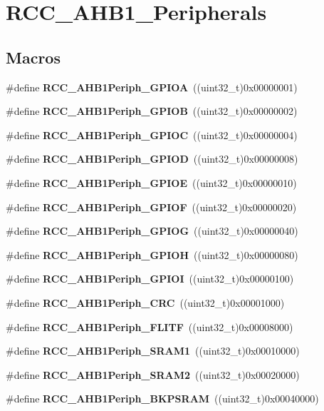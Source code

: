 \section{R\+C\+C\+\_\+\+A\+H\+B1\+\_\+\+Peripherals}
\label{group__RCC__AHB1__Peripherals}
\subsection*{Macros}
\begin{DoxyCompactItemize}
\item 
\#define \textbf{ R\+C\+C\+\_\+\+A\+H\+B1\+Periph\+\_\+\+G\+P\+I\+OA}~((uint32\+\_\+t)0x00000001)
\item 
\#define \textbf{ R\+C\+C\+\_\+\+A\+H\+B1\+Periph\+\_\+\+G\+P\+I\+OB}~((uint32\+\_\+t)0x00000002)
\item 
\#define \textbf{ R\+C\+C\+\_\+\+A\+H\+B1\+Periph\+\_\+\+G\+P\+I\+OC}~((uint32\+\_\+t)0x00000004)
\item 
\#define \textbf{ R\+C\+C\+\_\+\+A\+H\+B1\+Periph\+\_\+\+G\+P\+I\+OD}~((uint32\+\_\+t)0x00000008)
\item 
\#define \textbf{ R\+C\+C\+\_\+\+A\+H\+B1\+Periph\+\_\+\+G\+P\+I\+OE}~((uint32\+\_\+t)0x00000010)
\item 
\#define \textbf{ R\+C\+C\+\_\+\+A\+H\+B1\+Periph\+\_\+\+G\+P\+I\+OF}~((uint32\+\_\+t)0x00000020)
\item 
\#define \textbf{ R\+C\+C\+\_\+\+A\+H\+B1\+Periph\+\_\+\+G\+P\+I\+OG}~((uint32\+\_\+t)0x00000040)
\item 
\#define \textbf{ R\+C\+C\+\_\+\+A\+H\+B1\+Periph\+\_\+\+G\+P\+I\+OH}~((uint32\+\_\+t)0x00000080)
\item 
\#define \textbf{ R\+C\+C\+\_\+\+A\+H\+B1\+Periph\+\_\+\+G\+P\+I\+OI}~((uint32\+\_\+t)0x00000100)
\item 
\#define \textbf{ R\+C\+C\+\_\+\+A\+H\+B1\+Periph\+\_\+\+C\+RC}~((uint32\+\_\+t)0x00001000)
\item 
\#define \textbf{ R\+C\+C\+\_\+\+A\+H\+B1\+Periph\+\_\+\+F\+L\+I\+TF}~((uint32\+\_\+t)0x00008000)
\item 
\#define \textbf{ R\+C\+C\+\_\+\+A\+H\+B1\+Periph\+\_\+\+S\+R\+A\+M1}~((uint32\+\_\+t)0x00010000)
\item 
\#define \textbf{ R\+C\+C\+\_\+\+A\+H\+B1\+Periph\+\_\+\+S\+R\+A\+M2}~((uint32\+\_\+t)0x00020000)
\item 
\#define \textbf{ R\+C\+C\+\_\+\+A\+H\+B1\+Periph\+\_\+\+B\+K\+P\+S\+R\+AM}~((uint32\+\_\+t)0x00040000)

\end{DoxyCompactItemize}
